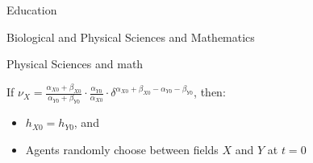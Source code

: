 \begin{frame}{Education}\label{app_education}
\end{frame}

\begin{frame}{Biological and Physical Sciences and Mathematics}\label{app_science_math}
\end{frame}

\begin{frame}{Physical Sciences and math}\label{app_physical_science_math}
\end{frame}


\begin{frame}{}\label{app_ability_v_effect}

If 
$\nu_X = 
\frac{\alpha_{X0} + \beta_{X0}}{\alpha_{Y0} + \beta_{Y0}} 
\cdot \frac{\alpha_{Y0}}{\alpha_{X0}}
\cdot \delta^{\alpha_{X0} + \beta_{X0} - \alpha_{Y0} - \beta_{Y0}}$, then:
\begin{itemize}
     \item $h_{X0} = h_{Y0}$, and
     \item Agents randomly choose between fields $X$ and $Y$ at $t=0$
 \end{itemize}  
\begin{figure}
\centering

\end{figure}
\hyperlink{app_v_effects}{}
\hyperlink{sim_beliefs}{}

\end{frame}


